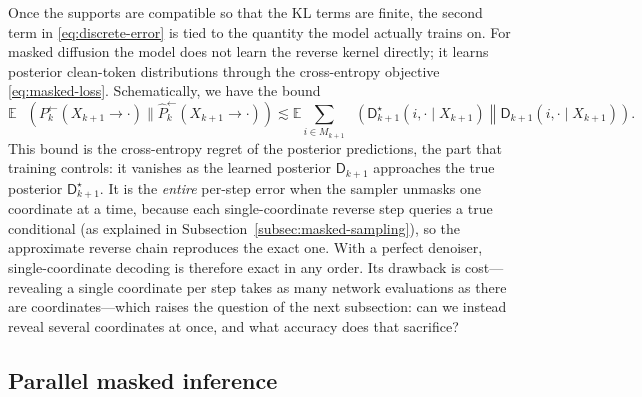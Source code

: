 \documentclass[10pt,a4paper]{amsart}
\numberwithin{equation}{section}
\DeclareMathOperator{\KL}{D_{\mathsf{KL}}}
\newcommand{\E}{\mathbb{E}}
\newcommand{\wh}[1]{\widehat{#1}}
\newcommand{\dstar}{\mathsf{D}^{\star}}
\newcommand{\denoiser}{\mathsf{D}}
\begin{document}
Once the supports are compatible so that the KL terms are finite, the second term in
\eqref{eq:discrete-error} is tied to the quantity the model actually trains on.
For masked diffusion the model does not learn the reverse kernel directly; it
learns posterior clean-token distributions through the cross-entropy objective
\eqref{eq:masked-loss}.  Schematically, we have the bound
\[
    \E\,\KL(P_k^{\leftarrow}(X_{k+1} \to \cdot)\|\wh P_k^{\leftarrow}(X_{k+1} \to \cdot))
    \lesssim
    \E\sum_{i\in M_{k+1}}
    \KL\!\left(
    \dstar_{k+1}(i,\cdot\mid X_{k+1})
    \middle\|
    \denoiser_{k+1}(i,\cdot\mid X_{k+1})
    \right).
\]
This bound is the cross-entropy regret of the posterior predictions, the part
that training controls: it vanishes as the learned posterior
$\denoiser_{k+1}$ approaches the true posterior $\dstar_{k+1}$.  It is the
\emph{entire} per-step error when the sampler unmasks one coordinate at a time,
because each single-coordinate reverse step queries a true conditional (as
explained in Subsection~\ref{subsec:masked-sampling}), so the approximate reverse
chain reproduces the exact one.  With a perfect denoiser, single-coordinate
decoding is therefore exact in any order.  Its drawback is cost---revealing a
single coordinate per step takes as many network evaluations as there are
coordinates---which raises the question of the next subsection: can we instead
reveal several coordinates at once, and what accuracy does that sacrifice?

\subsection{Parallel masked inference}
\label{subsec:parallel-inference}
\end{document}
